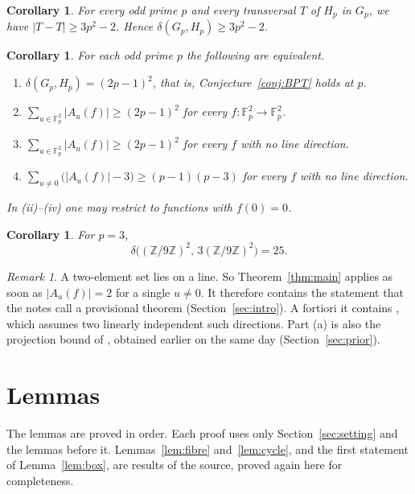 \documentclass[11pt]{amsart}
\newtheorem{corollary}[theorem]{Corollary}
\theoremstyle{definition}\newtheorem{definition}[theorem]{Definition}
\theoremstyle{remark}\newtheorem{remark}[theorem]{Remark}
\newcommand{\F}{\mathbb{F}}
\newcommand{\Z}{\mathbb{Z}}
\newcommand{\abs}[1]{\lvert #1\rvert}
\begin{document}
\begin{corollary}\label{cor:lower}
For every odd prime \(p\) and every transversal \(T\) of \(H_p\) in \(G_p\), we have \(\abs{T-T}\ge3p^2-2\).
Hence \(\delta(G_p,H_p)\ge3p^2-2\).
\end{corollary}

\begin{corollary}\label{cor:reduction}
For each odd prime \(p\) the following are equivalent.
\begin{enumerate}
\item[(i)] \(\delta(G_p,H_p)=(2p-1)^2\), that is, Conjecture~\ref{conj:BPT} holds at \(p\).
\item[(ii)] \(\sum_{u\in\F_p^2}\abs{A_u(f)}\ge(2p-1)^2\) for every \(f\colon\F_p^2\to\F_p^2\).
\item[(iii)] \(\sum_{u\in\F_p^2}\abs{A_u(f)}\ge(2p-1)^2\) for every \(f\) with no line direction.
\item[(iv)] \(\sum_{u\ne0}\bigl(\abs{A_u(f)}-3\bigr)\ge(p-1)(p-3)\) for every \(f\) with no line direction.
\end{enumerate}
In (ii)--(iv) one may restrict to functions with \(f(0)=0\).
\end{corollary}

\begin{corollary}\label{cor:p3}
For \(p=3\),
\[
\delta\bigl((\Z/9\Z)^2,\,3(\Z/9\Z)^2\bigr)=25 .
\]
\end{corollary}

\begin{remark}\label{rem:special}
A two-element set lies on a line.
So Theorem~\ref{thm:main} applies as soon as \(\abs{A_u(f)}=2\) for a single \(u\ne0\).
It therefore contains the statement that the notes \cite{automath} call a provisional theorem (Section~\ref{sec:intro}).
A fortiori it contains \cite[Lemma~6.4]{BPT}, which assumes two linearly independent such directions.
Part (a) is also the projection bound of \cite{leshner}, obtained earlier on the same day (Section~\ref{sec:prior}).
\end{remark}

\section{Lemmas}\label{sec:lemmas}

The lemmas are proved in order.
Each proof uses only Section~\ref{sec:setting} and the lemmas before it.
Lemmas~\ref{lem:fibre} and~\ref{lem:cycle}, and the first statement of Lemma~\ref{lem:box}, are results of the source, proved again here for completeness.
\end{document}
